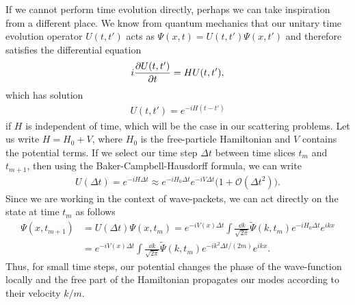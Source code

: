 If we cannot perform time evolution directly, perhaps we can take inspiration from a different place.
We know from quantum mechanics that our unitary time evolution operator $U(t,t')$ acts as $\Psi(x,t) = U(t,t') \Psi(x,t')$ and therefore satisfies the differential equation
\begin{align}
    i \pdv{U(t,t')}{t} = H U(t,t')
,\end{align}
which has solution
\begin{align}
    U(t,t') = e^{-i H (t - t')}
\end{align}
if $H$ is independent of time, which will be the case in our scattering problems.
Let us write $H = H_0 + V$, where $H_0$ is the free-particle Hamiltonian and $V$ contains the potential terms.
If we select our time step $\Delta t$ between time slices $t_{m}$ and $t_{m+1}$, then using the Baker-Campbell-Hausdorff formula, we can write
\begin{align}
    U(\Delta t) = e^{-i H \Delta t} \approx e^{-i H_0 \Delta t} e^{-i V \Delta t} \Big( 1 + \mathcal{O}(\Delta t^2) \Big)
.\end{align}
Since we are working in the context of wave-packets, we can act directly on the state at time $t_{m}$ as follows
\begin{align}
    \Psi(x,t_{m+1}) &= U(\Delta t) \Psi(x,t_{m}) = e^{-i V(x) \Delta t} \int \frac{\dd{k}}{\sqrt{2 \pi}} \widetilde{\Psi}(k,t_{m}) e^{-i H_0 \Delta t} e^{i k x} \nonumber \\
    &= e^{-i V(x) \Delta t} \int \frac{\dd{k}}{\sqrt{2 \pi}} \widetilde{\Psi}(k,t_{m}) e^{- i k^2 \Delta t / (2m)} e^{i k x}
.\end{align}
Thus, for small time steps, our potential changes the phase of the wave-function locally and the free part of the Hamiltonian propagates our modes according to their velocity $k/m$.




    

